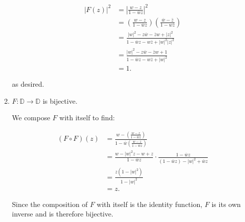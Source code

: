 \begin{enumerate}
\begin{solution}
        \begin{align*}
            \left| F(z) \right|^2 &= \left| \frac{w - z}{1 - \overline{w}z} \right|^2 \\
                                  &= \left( \frac{w - z}{1 - \overline{w}z} \right) \left( \frac{\overline{w} - \overline{z}}{1 - w \overline{z}} \right) \\
                                  &= \frac{|w|^2 - z \overline{w} - \overline{z} w + |z|^2}{1 - \overline{w}{z} - w \overline{z} + |w|^2 |z|^2} \\
                                  &= \frac{|w|^2 - z \overline{w} - \overline{z} w + 1}{1 - \overline{w}{z} - w \overline{z} + |w|^2} \\
                                  &= 1.
        \end{align*}

        as desired.
    \end{solution}

    \item $F: \mathbb{D} \to \mathbb{D}$ is bijective.
    
    \begin{solution}
        We compose $F$ with itself to find:

        \begin{align*}
            (F \circ F)(z) &= \frac{w - \left(\frac{w - z}{1 - \overline{w} z} \right)}{1 - \overline{w} \left( \frac{w - z}{1 - \overline{w} z} \right)} \\
                           &= \frac{w - |w|^2 z - w + z}{1 - \overline{w} z} \cdot \frac{1 - \overline{w} z}{(1 - \overline{w} z) - |w|^2 + \overline{w} z} \\
                           &= \frac{z\left( 1 - |w|^2 \right)}{1 - |w|^2} \\
                           &= z.
        \end{align*}

        Since the composition of $F$ with itself is the identity function, $F$ is its own inverse and is therefore 
        bijective.
        \ \\
    \end{solution}
\end{enumerate}